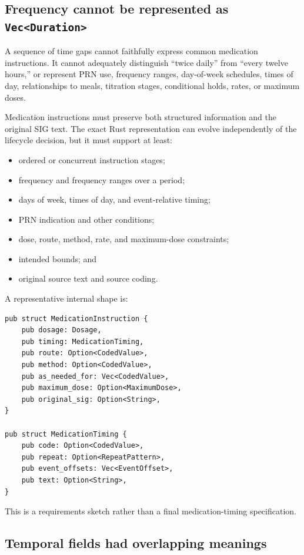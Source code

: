 \documentclass[11pt]{article}
\begin{document}
\subsection{Frequency cannot be represented as \texttt{Vec<Duration>}}

A sequence of time gaps cannot faithfully express common medication
instructions. It cannot adequately distinguish ``twice daily'' from ``every
twelve hours,'' or represent PRN use, frequency ranges, day-of-week schedules,
times of day, relationships to meals, titration stages, conditional holds,
rates, or maximum doses.

Medication instructions must preserve both structured information and the
original SIG text. The exact Rust representation can evolve independently of
the lifecycle decision, but it must support at least:

\begin{itemize}[noitemsep]
  \item ordered or concurrent instruction stages;
  \item frequency and frequency ranges over a period;
  \item days of week, times of day, and event-relative timing;
  \item PRN indication and other conditions;
  \item dose, route, method, rate, and maximum-dose constraints;
  \item intended bounds; and
  \item original source text and source coding.
\end{itemize}

A representative internal shape is:

\begin{lstlisting}
pub struct MedicationInstruction {
    pub dosage: Dosage,
    pub timing: MedicationTiming,
    pub route: Option<CodedValue>,
    pub method: Option<CodedValue>,
    pub as_needed_for: Vec<CodedValue>,
    pub maximum_dose: Option<MaximumDose>,
    pub original_sig: Option<String>,
}

pub struct MedicationTiming {
    pub code: Option<CodedValue>,
    pub repeat: Option<RepeatPattern>,
    pub event_offsets: Vec<EventOffset>,
    pub text: Option<String>,
}
\end{lstlisting}

This is a requirements sketch rather than a final medication-timing
specification.

\subsection{Temporal fields had overlapping meanings}
\end{document}
